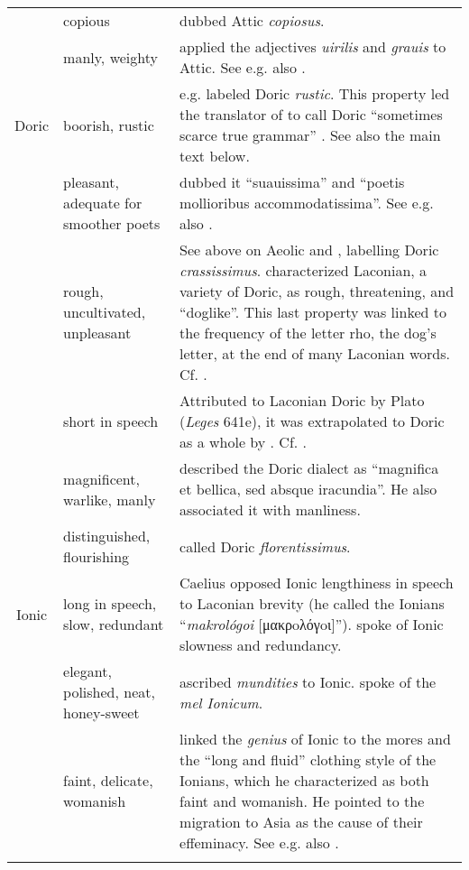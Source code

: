 \begin{table}
\begin{tabularx}{\textwidth}{XXX}
& copious & \citet[a.3\textsc{\textsuperscript{v}}]{Canini1555} dubbed Attic \textit{copiosus}.\\
 & manly, weighty & \citet[6]{Graun1729} applied the adjectives \textit{uirilis} and \textit{grauis} to Attic. See e.g. also \citet[515]{Fabricius1711}.\\
\multicolumn{1}{c}{Doric} & boorish, rustic & \citet[317]{Bentley1699} e.g. labeled Doric \textit{rustic}. This property led the translator of \citet[117]{Rapin1659} to call Doric “sometimes scarce true grammar” \citep[31]{Rapin1684}. See also the main text below.\\
& pleasant, adequate for smoother poets & \citet[a.4\textsc{\textsuperscript{r}}]{Canini1555} dubbed it “suauissima” and “poetis mollioribus accommodatissima”. See e.g. also \citet[139\textsc{\textsuperscript{r}}]{Vuidius1569}.\\
 & rough, uncultivated, unpleasant & See above on Aeolic and \citet[46\textsc{\textsuperscript{r}}]{Gessner1555}, labelling Doric \textit{crassissimus}. \citet[54]{Vossius1673} characterized Laconian, a variety of Doric, as rough, threatening, and “doglike”. This last property was linked to the frequency of the letter rho, the dog’s letter, at the end of many Laconian words. Cf. \citet[24]{Munthe1748}.\\
 & short in speech & Attributed to Laconian Doric by Plato (\textit{Leges} 641e), it was extrapolated to Doric as a whole by \citet[393]{Saumaise1643a}. Cf. \citet[138\textsc{\textsuperscript{v}}]{Beroaldo1493}.\\
 & magnificent, warlike, manly & \citet[55]{Vossius1673} described the Doric dialect as “magnifica et bellica, sed absque iracundia”. He also associated it with manliness.\\
 & distinguished, flourishing & \citet[161]{Gesner1774} called Doric \textit{florentissimus}.\\
\multicolumn{1}{c}{Ionic} & long in speech, slow, redundant & Caelius \citet[677]{Rhodiginus1542} opposed Ionic lengthiness in speech to Laconian brevity (he called the Ionians “\textit{makrológoi} [μακρoλόγoι]”). \citet[75]{Saumaise1643a} spoke of Ionic slowness and redundancy.\\
& elegant, polished, neat, honey-sweet & \citet[\textsc{a.2}\textsc{\textsuperscript{r}}]{Hauptmann1776} ascribed \textit{mundities} to Ionic. \citet[290]{Verwey1684} spoke of the \textit{mel Ionicum}.\\
 & faint, delicate, womanish & \citet[75]{Saumaise1643a} linked the \textit{genius} of Ionic to the mores and the “long and fluid” clothing style of the Ionians, which he characterized as both faint and womanish. He pointed to the migration to Asia as the cause of their effeminacy. See e.g. also \citet[139\textsc{\textsuperscript{r}}]{Vuidius1569}.\\

\lspbottomrule
\end{tabularx}
\end{table}

